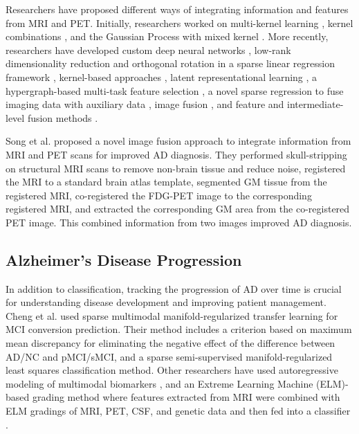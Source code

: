 Researchers have proposed different ways of integrating information and features from MRI and PET. Initially, researchers worked on multi-kernel learning \cite{hinrichs_predictive_2011}, kernel combinations \cite{zhang_multi-modal_2012}, and the Gaussian Process with mixed kernel \cite{young_accurate_2013}. More recently, researchers have developed custom deep neural networks \cite{lu_multimodal_2018}, low-rank dimensionality reduction and orthogonal rotation in a sparse linear regression framework \cite{zhu_low-rank_2019}, kernel-based approaches \cite{gupta_prediction_2019}, latent representational learning \cite{zhou_latent_2019}, a hypergraph-based multi-task feature selection \cite{shao_hypergraph_2020},\cite{zu_label-aligned_2016} a novel sparse regression to fuse imaging data with auxiliary data \cite{shen_heterogeneous_2021}, image fusion \cite{song_effective_2021}, and feature and intermediate-level fusion methods \cite{singh_multi-modal_2023}.

Song et al. \cite{song_effective_2021} proposed a novel image fusion approach to integrate information from MRI and PET scans for improved AD diagnosis. They performed skull-stripping on structural MRI scans to remove non-brain tissue and reduce noise, registered the MRI to a standard brain atlas template, segmented GM tissue from the registered MRI, co-registered the FDG-PET image to the corresponding registered MRI, and extracted the corresponding GM area from the co-registered PET image. This combined information from two images improved AD diagnosis.

\subsection{Alzheimer's Disease Progression}
In addition to classification, tracking the progression of AD over time is crucial for understanding disease development and improving patient management. Cheng et al. \cite{cheng_multimodal_2015} used sparse multimodal manifold-regularized transfer learning for MCI conversion prediction. Their method includes a criterion based on maximum mean discrepancy for eliminating the negative effect of the difference between AD/NC and pMCI/sMCI, and a sparse semi-supervised manifold-regularized least squares classification method. Other researchers have used autoregressive modeling of multimodal biomarkers \cite{minhas_predicting_2018}, and an Extreme Learning Machine (ELM)-based grading method where features extracted from MRI were combined with ELM gradings of MRI, PET, CSF, and genetic data and then fed into a classifier \cite{lin_predicting_2020}.

